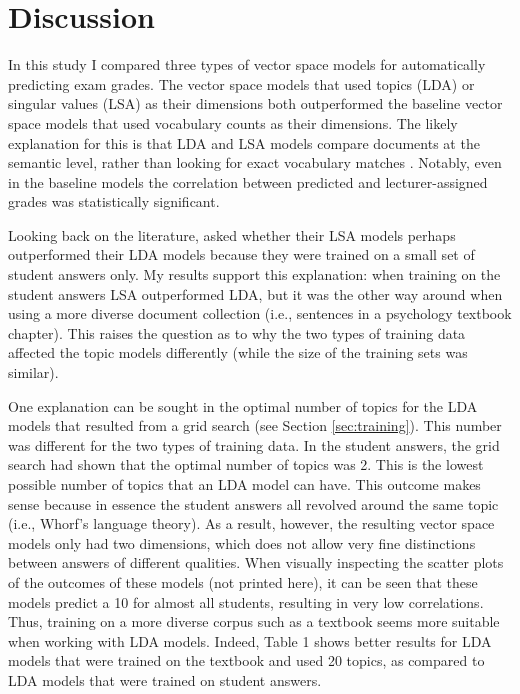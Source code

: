 \documentclass[a4paper,10pt,twoside]{article}
\begin{document}
\section{Discussion}
In this study I compared three types of vector space models for automatically predicting exam grades. The vector space models that used topics (LDA) or singular values (LSA) as their dimensions both outperformed the baseline vector space models that used vocabulary counts as their dimensions. The likely explanation for this is that LDA and LSA models compare documents at the semantic level, rather than looking for exact vocabulary matches \cite{kakkonen2008}. Notably, even in the baseline models the correlation between predicted and lecturer-assigned grades was statistically significant.

Looking back on the literature,  asked whether their LSA models perhaps outperformed their LDA models because they were trained on a small set of student answers only. My results support this explanation: when training on the student answers LSA outperformed LDA, but it was the other way around when using a more diverse document collection (i.e., sentences in a psychology textbook chapter). This raises the question as to why the two types of training data affected the topic models differently (while the size of the training sets was similar).

One explanation can be sought in the optimal number of topics for the LDA models that resulted from a grid search (see Section \ref{sec:training}). This number was different for the two types of training data. In the student answers, the grid search had shown that the optimal number of topics was 2. This is the lowest possible number of topics that an LDA model can have. This outcome makes sense because in essence the student answers all revolved around the same topic (i.e., Whorf's language theory). As a result, however, the resulting vector space models only had two dimensions, which does not allow very fine distinctions between answers of different qualities. When visually inspecting the scatter plots of the outcomes of these models (not printed here), it can be seen that these models predict a 10 for almost all students, resulting in very low correlations. Thus, training on a more diverse corpus such as a textbook seems more suitable when working with LDA models. Indeed, Table 1 shows better results for LDA models that were trained on the textbook and used 20 topics, as compared to LDA models that were trained on student answers.
\end{document}
